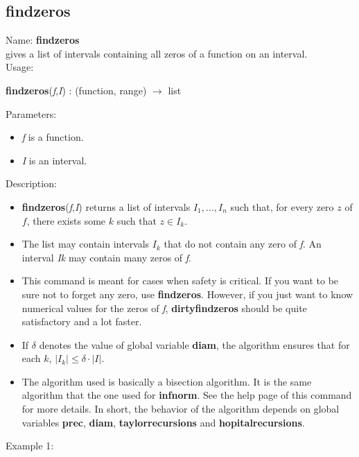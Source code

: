 \subsection{findzeros}
\label{labfindzeros}
\noindent Name: \textbf{findzeros}\\
gives a list of intervals containing all zeros of a function on an interval.\\
\noindent Usage: 
\begin{center}
\textbf{findzeros}(\emph{f},\emph{I}) : (\textsf{function}, \textsf{range}) $\rightarrow$ \textsf{list}
\\ 
\end{center}
Parameters: 
\begin{itemize}
\item \emph{f} is a function.
\item \emph{I} is an interval.
\end{itemize}
\noindent Description: \begin{itemize}

\item \textbf{findzeros}(\emph{f},\emph{I}) returns a list of intervals $I_1, \dots, I_n$ such that, for 
   every zero $z$ of $f$, there exists some $k$ such that $z \in I_k$.

\item The list may contain intervals $I_k$ that do not contain any zero of \emph{f}.
   An interval \emph{Ik} may contain many zeros of \emph{f}.

\item This command is meant for cases when safety is critical. If you want to be sure
   not to forget any zero, use \textbf{findzeros}. However, if you just want to know 
   numerical values for the zeros of \emph{f}, \textbf{dirtyfindzeros} should be quite 
   satisfactory and a lot faster.

\item If $\delta$ denotes the value of global variable \textbf{diam}, the algorithm ensures
   that for each $k$, $|I_k| \le \delta \cdot |I|$.

\item The algorithm used is basically a bisection algorithm. It is the same algorithm
   that the one used for \textbf{infnorm}. See the help page of this command for more 
   details. In short, the behavior of the algorithm depends on global variables
   \textbf{prec}, \textbf{diam}, \textbf{taylorrecursions} and \textbf{hopitalrecursions}.
\end{itemize}
\noindent Example 1: 
